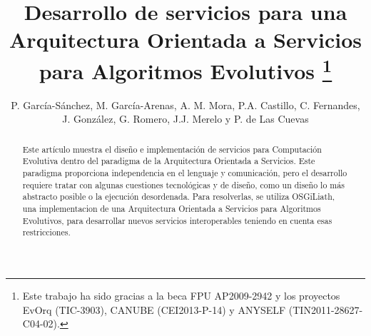 \documentclass[runningheads]{llncs}
\begin{document}
\mainmatter  %



\title{Desarrollo de servicios para una Arquitectura Orientada a Servicios para Algoritmos Evolutivos \thanks{Este trabajo ha sido gracias a la beca FPU AP2009-2942 y los proyectos EvOrq (TIC-3903), CANUBE (CEI2013-P-14) y ANYSELF (TIN2011-28627-C04-02).
}}


\author{P. García-Sánchez, M. García-Arenas, A. M. Mora, P.A. Castillo, C. Fernandes, J. González, G. Romero, J.J. Merelo y P. de Las Cuevas}

%







\maketitle
\begin{abstract}
Este artículo muestra el diseño e implementación de servicios para
Computación Evolutiva dentro del paradigma de la Arquitectura
Orientada a Servicios. Este paradigma proporciona independencia en el
lenguaje y comunicación, pero el desarrollo requiere tratar con
algunas cuestiones tecnológicas y de diseño, como un diseño lo más
abstracto posible o la ejecución desordenada. Para resolverlas, se utiliza
OSGiLiath, una implementacion de una Arquitectura Orientada a
Servicios para Algoritmos Evolutivos, para desarrollar nuevos
servicios interoperables teniendo en cuenta esas restricciones. %

\end{abstract}
\end{document}
